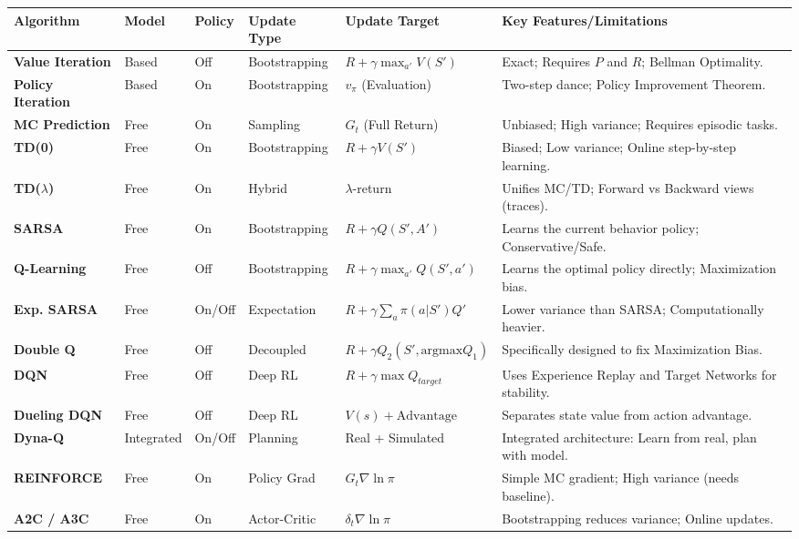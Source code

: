 \documentclass[11pt]{article}
\begin{document}
\begin{landscape}
\begin{center}
\small
\renewcommand{\arraystretch}{1.5}
\begin{longtable}{>{\bfseries}p{2.8cm} p{1.8cm} p{1.8cm} p{2.2cm} p{4cm} p{6cm}}
\toprule
Algorithm & Model & Policy & Update Type & Update Target & Key Features/Limitations \\ \midrule
Value Iteration & Based & Off & Bootstrapping & $R + \gamma \max_{a'} V(S')$ & Exact; Requires $P$ and $R$; Bellman Optimality. \\
Policy Iteration & Based & On & Bootstrapping & $v_\pi$ (Evaluation) & Two-step dance; Policy Improvement Theorem. \\ \midrule
MC Prediction & Free & On & Sampling & $G_t$ (Full Return) & Unbiased; High variance; Requires episodic tasks. \\
TD(0) & Free & On & Bootstrapping & $R + \gamma V(S')$ & Biased; Low variance; Online step-by-step learning. \\
TD($\lambda$) & Free & On & Hybrid & $\lambda$-return & Unifies MC/TD; Forward vs Backward views (traces). \\ \midrule
SARSA & Free & On & Bootstrapping & $R + \gamma Q(S', A')$ & Learns the current behavior policy; Conservative/Safe. \\
Q-Learning & Free & Off & Bootstrapping & $R + \gamma \max_{a'} Q(S', a')$ & Learns the optimal policy directly; Maximization bias. \\
Exp. SARSA & Free & On/Off & Expectation & $R + \gamma \sum_a \pi(a|S') Q'$ & Lower variance than SARSA; Computationally heavier. \\
Double Q & Free & Off & Decoupled & $R + \gamma Q_2(S', \text{argmax} Q_1)$ & Specifically designed to fix Maximization Bias. \\ \midrule
DQN & Free & Off & Deep RL & $R + \gamma \max Q_{target}$ & Uses Experience Replay and Target Networks for stability. \\
Dueling DQN & Free & Off & Deep RL & $V(s) + \text{Advantage}$ & Separates state value from action advantage. \\
Dyna-Q & Integrated & On/Off & Planning & Real + Simulated & Integrated architecture: Learn from real, plan with model. \\ \midrule
REINFORCE & Free & On & Policy Grad & $G_t \nabla \ln \pi$ & Simple MC gradient; High variance (needs baseline). \\
A2C / A3C & Free & On & Actor-Critic & $\delta_t \nabla \ln \pi$ & Bootstrapping reduces variance; Online updates. \\

\end{longtable}
\end{center}
\end{landscape}
\end{document}
